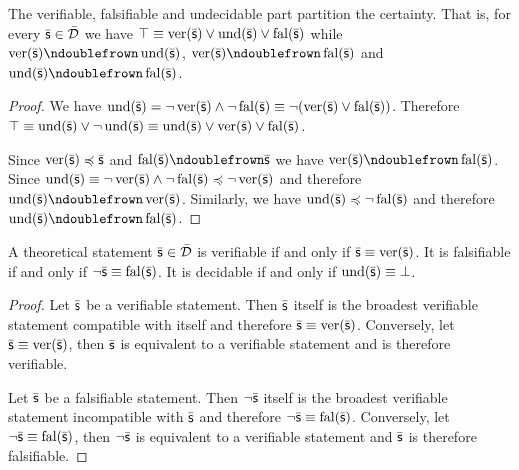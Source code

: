 \documentclass[11pt,letterpaper,fleqn]{memoir} %
\begin{document}
\begin{mathSection}
\begin{coro}
	The verifiable, falsifiable and undecidable part partition the certainty. That is, for every $\bar{\mathsf{s}} \in \bar{\mathcal{D}}$ we have $\top \equiv \operatorname{ver}(\bar{\mathsf{s}}) \vee \operatorname{und}(\bar{\mathsf{s}}) \vee \operatorname{fal}(\bar{\mathsf{s}})$ while $\ver(\bar{\stmt}) \ncomp \und(\bar{\stmt})$, $\ver(\bar{\stmt}) \ncomp \fal(\bar{\stmt})$ and $\und(\bar{\stmt}) \ncomp \fal(\bar{\stmt})$.
\end{coro}
	
\begin{proof}
	We have $\operatorname{und}(\bar{\mathsf{s}}) = \neg \operatorname{ver}(\bar{\mathsf{s}}) \wedge \neg \operatorname{fal}(\bar{\mathsf{s}}) \equiv \neg (\operatorname{ver}(\bar{\mathsf{s}}) \vee \operatorname{fal}(\bar{\mathsf{s}}))$. Therefore $\top \equiv \operatorname{und}(\bar{\mathsf{s}}) \vee \neg \operatorname{und}(\bar{\mathsf{s}}) \equiv \operatorname{und}(\bar{\mathsf{s}}) \vee \operatorname{ver}(\bar{\mathsf{s}}) \vee \operatorname{fal}(\bar{\mathsf{s}})$.
	
	Since $\operatorname{ver}(\bar{\mathsf{s}}) \preccurlyeq \bar{\mathsf{s}}$ and $\fal(\bar{\stmt}) \ncomp \bar{\stmt}$ we have $\ver(\bar{\stmt}) \ncomp \fal(\bar{\stmt})$. Since $\operatorname{und}(\bar{\mathsf{s}}) \equiv \neg \operatorname{ver}(\bar{\mathsf{s}}) \wedge \neg \operatorname{fal}(\bar{\mathsf{s}}) \preccurlyeq \neg \operatorname{ver}(\bar{\mathsf{s}})$ and therefore $\und(\bar{\stmt}) \ncomp \ver(\bar{\stmt})$. Similarly, we have $\operatorname{und}(\bar{\mathsf{s}}) \preccurlyeq \neg \operatorname{fal}(\bar{\mathsf{s}})$ and therefore $\und(\bar{\stmt}) \ncomp \fal(\bar{\stmt})$.
\end{proof}
	
\begin{coro}
	A theoretical statement $\bar{\mathsf{s}} \in \bar{\mathcal{D}}$ is verifiable if and only if $\bar{\mathsf{s}} \equiv \operatorname{ver}(\bar{\mathsf{s}})$. It is falsifiable if and only if $\neg\bar{\mathsf{s}} \equiv \operatorname{fal}(\bar{\mathsf{s}})$. It is decidable if and only if $\operatorname{und}(\bar{\mathsf{s}}) \equiv \bot$.
\end{coro}
\begin{proof}
	Let $\bar{\mathsf{s}}$ be a verifiable statement. Then $\bar{\mathsf{s}}$ itself is the broadest verifiable statement compatible with itself and therefore $\bar{\mathsf{s}} \equiv \operatorname{ver}(\bar{\mathsf{s}})$. Conversely, let $\bar{\mathsf{s}} \equiv \operatorname{ver}(\bar{\mathsf{s}})$, then $\bar{\mathsf{s}}$ is equivalent to a verifiable statement and is therefore verifiable.
	
	Let $\bar{\mathsf{s}}$ be a falsifiable statement. Then $\neg\bar{\mathsf{s}}$ itself is the broadest verifiable statement incompatible with $\bar{\mathsf{s}}$ and therefore $\neg\bar{\mathsf{s}} \equiv \operatorname{fal}(\bar{\mathsf{s}})$. Conversely, let $\neg\bar{\mathsf{s}} \equiv \operatorname{fal}(\bar{\mathsf{s}})$, then $\neg\bar{\mathsf{s}}$ is equivalent to a verifiable statement and $\bar{\mathsf{s}}$ is therefore falsifiable.
	

\end{proof}
\end{mathSection}
\end{document}
